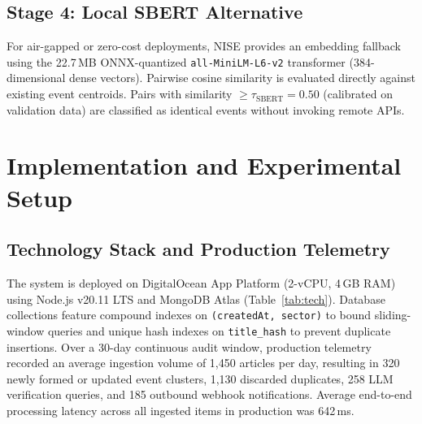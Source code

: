 \documentclass[conference]{IEEEtran}
\begin{document}
\subsection{Stage 4: Local SBERT Alternative}
For air-gapped or zero-cost deployments, NISE provides an embedding fallback using the 22.7\,MB ONNX-quantized \texttt{all-MiniLM-L6-v2} transformer (384-dimensional dense vectors).
Pairwise cosine similarity is evaluated directly against existing event centroids.
Pairs with similarity $\ge \tau_{\text{SBERT}} = 0.50$ (calibrated on validation data) are classified as identical events without invoking remote APIs.

\section{Implementation and Experimental Setup}

\subsection{Technology Stack and Production Telemetry}
The system is deployed on DigitalOcean App Platform (2-vCPU, 4\,GB RAM) using Node.js v20.11 LTS and MongoDB Atlas (Table~\ref{tab:tech}).
Database collections feature compound indexes on \texttt{(createdAt, sector)} to bound sliding-window queries and unique hash indexes on \texttt{title\_hash} to prevent duplicate insertions.
Over a 30-day continuous audit window, production telemetry recorded an average ingestion volume of 1,450 articles per day, resulting in 320 newly formed or updated event clusters, 1,130 discarded duplicates, 258 LLM verification queries, and 185 outbound webhook notifications.
Average end-to-end processing latency across all ingested items in production was 642\,ms.

\begin{table}[!t]
\centering
\caption{Production Technology Stack}
\label{tab:tech}
\end{table}
\end{document}
